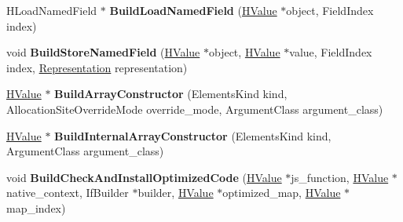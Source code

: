 \begin{DoxyCompactItemize}
\item 
\hypertarget{classv8_1_1internal_1_1_code_stub_graph_builder_base_a8547e90b4aa5429d61314a57c22efafb}{}H\+Load\+Named\+Field $\ast$ {\bfseries Build\+Load\+Named\+Field} (\hyperlink{classv8_1_1internal_1_1_h_value}{H\+Value} $\ast$object, Field\+Index index)\label{classv8_1_1internal_1_1_code_stub_graph_builder_base_a8547e90b4aa5429d61314a57c22efafb}

\item 
\hypertarget{classv8_1_1internal_1_1_code_stub_graph_builder_base_a6f02996d34035ca4608fc4b778e391c7}{}void {\bfseries Build\+Store\+Named\+Field} (\hyperlink{classv8_1_1internal_1_1_h_value}{H\+Value} $\ast$object, \hyperlink{classv8_1_1internal_1_1_h_value}{H\+Value} $\ast$value, Field\+Index index, \hyperlink{classv8_1_1internal_1_1_representation}{Representation} representation)\label{classv8_1_1internal_1_1_code_stub_graph_builder_base_a6f02996d34035ca4608fc4b778e391c7}

\item 
\hypertarget{classv8_1_1internal_1_1_code_stub_graph_builder_base_a1e89846ec8bb2472f128fbb2747eb5a8}{}\hyperlink{classv8_1_1internal_1_1_h_value}{H\+Value} $\ast$ {\bfseries Build\+Array\+Constructor} (Elements\+Kind kind, Allocation\+Site\+Override\+Mode override\+\_\+mode, Argument\+Class argument\+\_\+class)\label{classv8_1_1internal_1_1_code_stub_graph_builder_base_a1e89846ec8bb2472f128fbb2747eb5a8}

\item 
\hypertarget{classv8_1_1internal_1_1_code_stub_graph_builder_base_ac388d641a2841562823693a3611052a5}{}\hyperlink{classv8_1_1internal_1_1_h_value}{H\+Value} $\ast$ {\bfseries Build\+Internal\+Array\+Constructor} (Elements\+Kind kind, Argument\+Class argument\+\_\+class)\label{classv8_1_1internal_1_1_code_stub_graph_builder_base_ac388d641a2841562823693a3611052a5}

\item 
\hypertarget{classv8_1_1internal_1_1_code_stub_graph_builder_base_ab2af07e7dfda0b6a3d510d73deaff723}{}void {\bfseries Build\+Check\+And\+Install\+Optimized\+Code} (\hyperlink{classv8_1_1internal_1_1_h_value}{H\+Value} $\ast$js\+\_\+function, \hyperlink{classv8_1_1internal_1_1_h_value}{H\+Value} $\ast$native\+\_\+context, If\+Builder $\ast$builder, \hyperlink{classv8_1_1internal_1_1_h_value}{H\+Value} $\ast$optimized\+\_\+map, \hyperlink{classv8_1_1internal_1_1_h_value}{H\+Value} $\ast$map\+\_\+index)\label{classv8_1_1internal_1_1_code_stub_graph_builder_base_ab2af07e7dfda0b6a3d510d73deaff723}


\end{DoxyCompactItemize}
